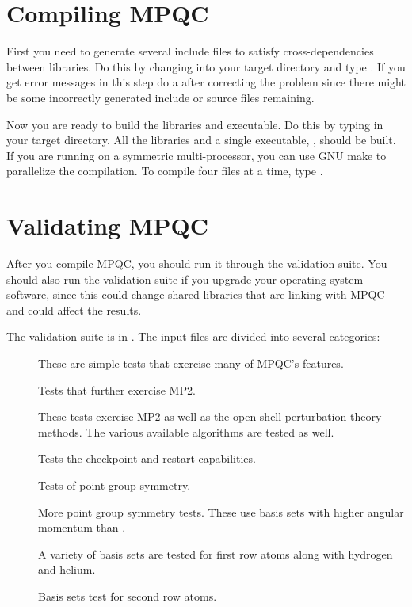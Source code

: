 \section{Compiling MPQC}

 First you need to generate several include files to satisfy
cross-dependencies between libraries.  Do this by changing into
your target directory and type .  If you get error
messages in this step do a  after correcting the
problem since there might be some incorrectly generated include or source
files remaining.

 Now you are ready to build the libraries and executable.  Do this
by typing  in your target directory.  All the libraries and
a single executable, , should be built.
If you are running on a symmetric multi-processor, you can use GNU
make to parallelize the compilation.  To compile four files at a time,
type .

\section{Validating MPQC}

 After you compile MPQC, you should run it through the validation suite.
You should also run the validation suite if you upgrade your operating
system software, since this could change shared libraries that are linking
with MPQC and could affect the results.

 The validation suite is in .  The
input files are divided into several categories:
\begin{description}
  \item[] These are simple tests that exercise many of MPQC's
        features.

  \item[] Tests that further exercise MP2.

  \item[] These tests exercise MP2 as well as the open-shell
        perturbation theory methods.  The various available
        algorithms are tested as well.

  \item[] Tests the checkpoint and restart capabilities.

  \item[] Tests of point group symmetry.

  \item[] More point group symmetry tests.  These use basis
        sets with higher angular momentum than .

  \item[] A variety of basis sets are tested for first row
        atoms along with hydrogen and helium.

  \item[] Basis sets test for second row atoms.

\end{description}

